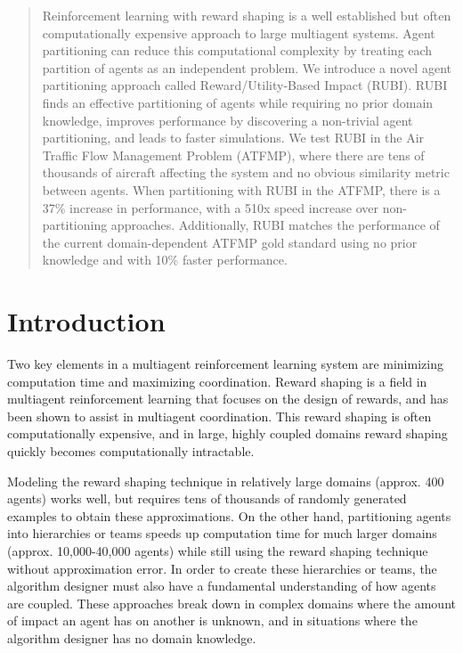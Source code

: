 \documentclass[letterpaper]{article}
\begin{document}
\begin{abstract}
Reinforcement learning with reward shaping is a well established but often computationally expensive approach to large multiagent systems. Agent partitioning can reduce this computational complexity by treating each partition of agents as an independent problem. We introduce a novel agent partitioning approach called Reward/Utility-Based Impact (RUBI). RUBI finds an effective partitioning of agents while requiring no prior domain knowledge, improves performance by discovering a non-trivial agent partitioning, and leads to faster simulations. We test RUBI in the Air Traffic Flow Management Problem (ATFMP), where there are tens of thousands of aircraft affecting the system and no obvious similarity metric between agents. When partitioning with RUBI in the ATFMP, there is a 37\% increase in performance, with a 510x speed increase over non-partitioning approaches. Additionally, RUBI matches the performance of the current domain-dependent ATFMP gold standard using no prior knowledge and with 10\% faster performance.

\end{abstract}







\section{Introduction}
Two key elements in a multiagent reinforcement learning system are minimizing computation time and maximizing coordination. Reward shaping is a field in multiagent reinforcement learning that focuses on the design of rewards, and has been shown to assist in multiagent coordination. This reward shaping is often computationally expensive, and in large, highly coupled domains reward shaping quickly becomes computationally intractable. 

Modeling the reward shaping technique \cite{Proper:2012:MDR:2343896.2344025} in relatively large domains (approx. 400 agents) works well, but requires tens of thousands of randomly generated examples to obtain these approximations. On the other hand, partitioning agents into hierarchies \cite{tumer-holmesparker_ala12} or teams \cite{Curran:2013:AHC:2484920.2485183} speeds up computation time for much larger domains (approx. 10,000-40,000 agents) while still using the reward shaping technique without approximation error. In order to create these hierarchies or teams, the algorithm designer must also have a fundamental understanding of how agents are coupled. These approaches break down in complex domains where the amount of impact an agent has on another is unknown, and in situations where the algorithm designer has no domain knowledge.
\end{document}
